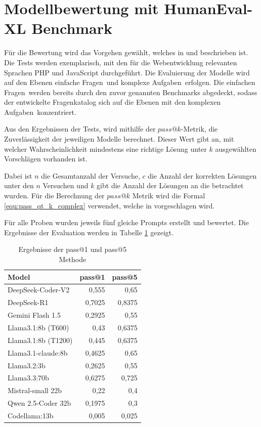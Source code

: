 \section{Modellbewertung mit HumanEval-XL Benchmark}
Für die Bewertung wird das Vorgehen gewählt, welches in \cite{chen-2021} und \cite{peng-2024} beschrieben ist. Die Tests werden exemplarisch, mit den für die Webentwicklung relevanten Sprachen PHP und JavaScript durchgeführt. Die Evaluierung der Modelle wird auf den Ebenen \glqq einfache Fragen\grqq \ und \glqq komplexe Aufgaben\grqq \ erfolgen. Die \glqq einfachen Fragen\grqq \ werden bereits durch den zuvor genannten Benchmarks abgedeckt, sodass der entwickelte Fragenkatalog sich auf die Ebenen mit den \glqq komplexen Aufgaben\grqq \ konzentriert.\vspace{0.2cm}

Aus den Ergebnissen der Tests, wird mithilfe der $pass@k$-Metrik, die Zuverlässigkeit der jeweiligen Modelle berechnet. Dieser Wert gibt an, mit welcher Wahrscheinlichkeit mindestens eine richtige Lösung unter $k$ ausgewählten Vorschlägen vorhanden ist.\vspace{0.2cm}

Dabei ist $n$ die Gesamtanzahl der Versuche, $c$ die Anzahl der korrekten Lösungen unter den $n$ Versuchen und $k$ gibt die Anzahl der Lösungen an die betrachtet wurden. Für die Berechnung der $pass@k$ Metrik wird die Formal \ref{equ:pass_qt_k_complex} verwendet, welche in \cite{chen-2021} vorgeschlagen wird.\vspace{0.2cm}

Für alle Proben wurden jeweils fünf gleiche Prompts erstellt und bewertet. Die Ergebnisse der Evaluation werden in Tabelle \ref{tab:prompt_results_open_models} gezeigt.

\begin{table}[!ht]
	\begin{tabular}{|l|r|r|}
		\hline
		\textbf{Model} & \textbf{pass@1} & \textbf{pass@5} \\
		\hline
		DeepSeek-Coder-V2   &  0,555 &     0,65 \\
		DeepSeek-R1         & 0,7025 &   0,8375 \\
		Gemini Flash 1.5    & 0,2925 &     0,55 \\
		Llama3.1:8b (T600)  &   0,43 &   0,6375 \\
		Llama3.1:8b (T1200) &  0,445 &   0,6375 \\
		Llama3.1-claude:8b  & 0,4625 &     0,65 \\
		Llama3.2:3b         & 0,2625 &     0,55 \\
		Llama3.3:70b        & 0,6275 &    0,725 \\
		Mistral-small 22b   &   0,22 &      0,4 \\
		Qwen 2.5-Coder 32b  & 0,1975 &      0,3 \\
		Codellama:13b       &  0,005 &    0,025 \\
		\hline
		\hline
	\end{tabular}
	\centering
	\label{tab:prompt_results_open_models}
	\caption{Ergebnisse der pass@1 und pass@5 Methode}
\end{table}

